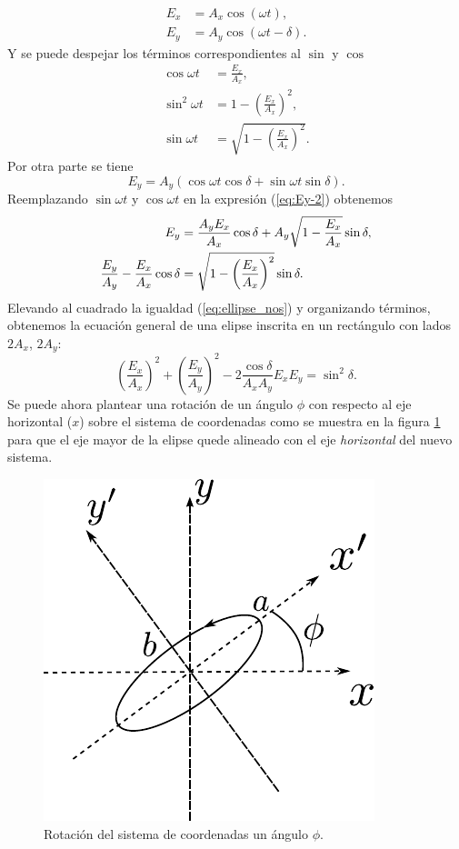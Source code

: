 \begin{align*}
E_x &= A_x\cos{ \left(\omega t \right)},\\
E_y &= A_y\cos{ \left(\omega t -\delta\right)}.
\end{align*}
Y se puede despejar los términos correspondientes al $\sin$ y $\cos$
 \begin{align*}
\cos{\omega t} &=\frac{E_x}{A_x},\\
\sin^2{\omega t} &= 1-\left(\frac{E_x}{A_x}\right)^2,\\
\sin{\omega t} &= \sqrt{1-\left(\frac{E_x}{A_x}\right)^2}.
\end{align*}
Por otra parte se tiene
\begin{equation}
  \label{eq:Ey-2}
E_y = A_y\left( \cos{\omega t}\cos{\delta}+\sin{\omega
    t}\sin{\delta}\right).  
\end{equation}
Reemplazando $\sin{\omega t} $ y $\cos{\omega t} $ en la expresión
(\ref{eq:Ey-2}) obtenemos
\begin{align}
E_y &= \frac{A_yE_x}{A_x}\cos{\delta} +
A_y\sqrt{1-\frac{E_x}{A_x}}\sin{\delta},\notag\\
\frac{E_y}{A_y} - \frac{E_x}{A_x}\cos{\delta}  &= 
\sqrt{1-\left(\frac{E_x}{A_x}\right)^2}\sin{\delta}.\label{eq:ellipse_nos}
\end{align}
Elevando al cuadrado la igualdad (\ref{eq:ellipse_nos}) y organizando
términos, obtenemos la ecuación general de una elipse inscrita en un
rectángulo con lados $2A_x$, $2A_y$: 
\begin{equation}
\left(\frac{E_x}{A_x}\right)^2+\left(\frac{E_y}{A_y}\right)^2-2\frac{\cos{\delta}}{A_xA_y}E_xE_y
= \sin^2{\delta}.
\label{eq:ellipse}
\end{equation}
Se puede ahora plantear una rotación de un ángulo $\phi$ con respecto
al eje horizontal ($x$) sobre el sistema de coordenadas  como se
muestra en la figura \ref{fig:ellipse} para que
el eje mayor de la elipse quede alineado con el eje
\textit{horizontal} del nuevo sistema. 
\begin{figure}[h!]
\centering
\includegraphics[scale = 1]{ellipse}
\caption[Rotación del sistema de coordenadas de la elipse de polarización]{Rotación del sistema de coordenadas un ángulo $\phi$.}
\label{fig:ellipse}
\end{figure}
